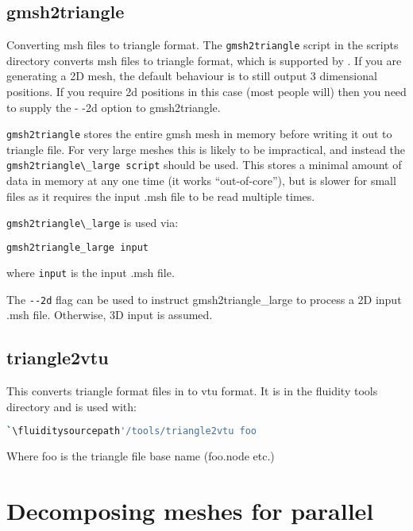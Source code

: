 \subsection{gmsh2triangle}
Converting msh files to triangle format. The \lstinline[language=Bash]{gmsh2triangle} script in the scripts
directory converts msh files to triangle format, which is supported by \fluidity.
If you are generating a 2D mesh, the default behaviour is to still
output 3 dimensional positions. If you require 2d positions in this case (most
people will) then you need to supply the - -2d option to gmsh2triangle.

\lstinline[language=Bash]{gmsh2triangle} stores the entire gmsh mesh in memory before writing it out to
triangle file. For very large meshes this is likely to be impractical,
and instead the \lstinline[language=Bash]{gmsh2triangle\_large script}
should be used. This stores a minimal
amount of data in memory at any one time (it works ``out-of-core''), but
is slower for small files as it requires the input .msh file to be read multiple
times.

\lstinline[language=Bash]{gmsh2triangle\_large} is used via:

\begin{lstlisting}[language = Bash]
gmsh2triangle_large input
\end{lstlisting}

where \lstinline[language = Bash]*input* is the input .msh file.

The \lstinline[language = Bash]+--2d+ flag can be used to instruct gmsh2triangle\_large
to process a 2D input .msh file. Otherwise, 3D input is assumed.

\subsection{triangle2vtu}
This converts triangle format files in to vtu format. It is in the fluidity tools directory and is used with:

\begin{lstlisting}[language = Bash]
`\fluiditysourcepath'/tools/triangle2vtu foo
\end{lstlisting}

Where foo is the triangle file base name (\ie foo.node etc.)

\section{Decomposing meshes for parallel}
\label{decomp_meshes_parallel}

